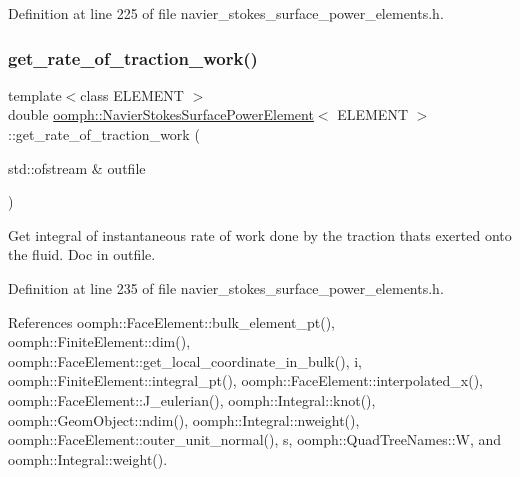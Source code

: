 Definition at line 225 of file navier\+\_\+stokes\+\_\+surface\+\_\+power\+\_\+elements.\+h.

\mbox{\label{classoomph_1_1NavierStokesSurfacePowerElement_aa46d2bfef7537d540c1103e6d832d8c1}} 
\subsubsection{\texorpdfstring{get\+\_\+rate\+\_\+of\+\_\+traction\+\_\+work()}{get\_rate\_of\_traction\_work()}\hspace{0.1cm}{\footnotesize\ttfamily [2/2]}}
{\footnotesize\ttfamily template$<$class E\+L\+E\+M\+E\+NT $>$ \\
double \hyperlink{classoomph_1_1NavierStokesSurfacePowerElement}{oomph\+::\+Navier\+Stokes\+Surface\+Power\+Element}$<$ E\+L\+E\+M\+E\+NT $>$\+::get\+\_\+rate\+\_\+of\+\_\+traction\+\_\+work (\begin{DoxyParamCaption}\item[{std\+::ofstream \&}]{outfile }\end{DoxyParamCaption})\hspace{0.3cm}{\ttfamily [inline]}}



Get integral of instantaneous rate of work done by the traction that\textquotesingle{}s exerted onto the fluid. Doc in outfile. 



Definition at line 235 of file navier\+\_\+stokes\+\_\+surface\+\_\+power\+\_\+elements.\+h.



References oomph\+::\+Face\+Element\+::bulk\+\_\+element\+\_\+pt(), oomph\+::\+Finite\+Element\+::dim(), oomph\+::\+Face\+Element\+::get\+\_\+local\+\_\+coordinate\+\_\+in\+\_\+bulk(), i, oomph\+::\+Finite\+Element\+::integral\+\_\+pt(), oomph\+::\+Face\+Element\+::interpolated\+\_\+x(), oomph\+::\+Face\+Element\+::\+J\+\_\+eulerian(), oomph\+::\+Integral\+::knot(), oomph\+::\+Geom\+Object\+::ndim(), oomph\+::\+Integral\+::nweight(), oomph\+::\+Face\+Element\+::outer\+\_\+unit\+\_\+normal(), s, oomph\+::\+Quad\+Tree\+Names\+::W, and oomph\+::\+Integral\+::weight().


